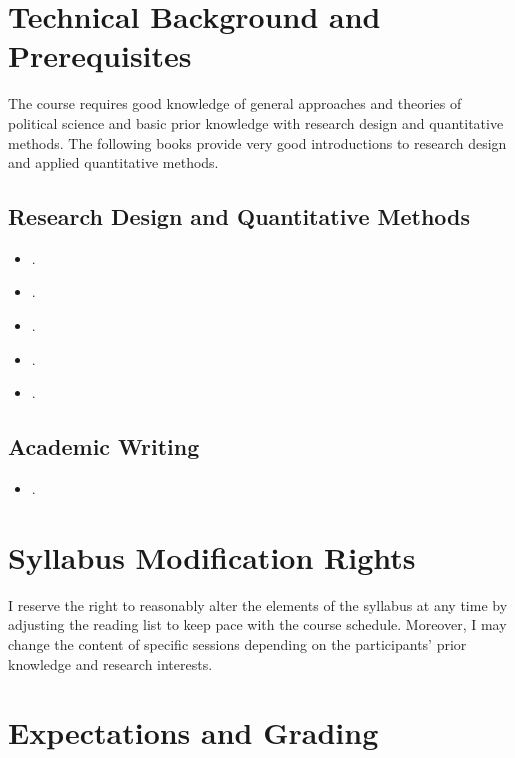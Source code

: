 \documentclass[abstract=on,parskip=full,headings=standardclasses,fontsize=11pt,paper=a4]{scrartcl}
\begin{document}
\section*{Technical Background and Prerequisites}

The course requires good knowledge of general approaches and theories of political science and basic prior knowledge with research design and quantitative methods. The following books provide very good introductions to research design and applied quantitative methods.

\subsection*{Research Design and Quantitative Methods}
\begin{itemize}
\item {}.
\item {}.
\item {}.
\item {}.
\item {}.
\end{itemize}

\subsection*{Academic Writing}
\begin{itemize}
\item {}.
\end{itemize}


\section*{Syllabus Modification Rights}

I reserve the right to reasonably alter the elements of the syllabus at any time by adjusting the reading list to keep pace with the course schedule. Moreover, I may change the content of specific sessions depending on the participants' prior knowledge and research interests.


\section*{Expectations and Grading}
\end{document}
